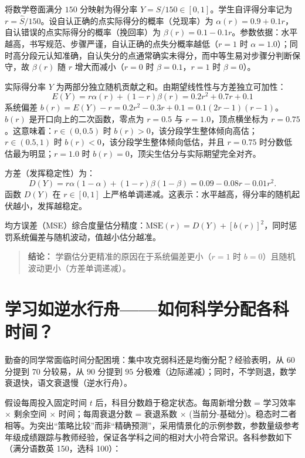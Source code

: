 \documentclass[10pt]{article}
\begin{document}
将数学卷面满分 $150$ 分映射为得分率 $Y=S/150\in[0,1]$。学生自评得分率记为 $r=\widehat S/150$。设自认正确的点实际得分的概率（兑现率）为 $\alpha(r)=0.9+0.1r$，自认错误的点实际得分的概率（挽回率）为 $\beta(r)=0.1-0.1r$。参数依据：水平越高，书写规范、步骤严谨，自认正确的点失分概率越低（$r=1$ 时 $\alpha=1.0$）；同时高分段元认知准确，自认失分的点通常确实未得分，而中等生易对步骤分判断保守，故 $\beta(r)$ 随 $r$ 增大而减小（$r=0$ 时 $\beta=0.1$，$r=1$ 时 $\beta=0$）。

实际得分率 $Y$ 为两部分独立随机贡献之和。由期望线性性与方差独立可加性：
$$
E(Y) = r\alpha(r) + (1-r)\beta(r) = 0.2r^2 + 0.7r + 0.1
$$
系统偏差 $b(r)=E(Y)-r = 0.2r^2 - 0.3r + 0.1 = 0.1(2r-1)(r-1)$。$b(r)$ 是开口向上的二次函数，零点为 $r=0.5$ 与 $r=1.0$，顶点横坐标为 $r=0.75$。这意味着：$r\in(0,0.5)$ 时 $b(r)>0$，该分段学生整体倾向高估；$r\in(0.5,1)$ 时 $b(r)<0$，该分段学生整体倾向低估，并且 $r=0.75$ 时分数低估最为明显；$r=1.0$ 时 $b(r)=0$，顶尖生估分与实际期望完全对齐。

方差（发挥稳定性）为：
$$
D(Y)=r\alpha(1-\alpha) + (1-r)\beta(1-\beta)=0.09-0.08r-0.01r^2.
$$
函数 $D(Y)$ 在 $r\in[0,1]$ 上严格单调递减。这表示：水平越高，得分率的随机起伏越小，发挥越稳定。

均方误差（MSE）综合度量估分精度：$\text{MSE}(r)=D(Y)+[b(r)]^2$，同时惩罚系统偏差与随机波动，值越小估分越准。

\begin{quote}
\textbf{结论：} 学霸估分更精准的原因在于系统偏差更小（$r=1$ 时 $b=0$）且随机波动更小（方差单调递减）。
\end{quote}

\section{学习如逆水行舟——如何科学分配各科时间？}

勤奋的同学常面临时间分配困境：集中攻克弱科还是均衡分配？经验表明，从 $60$ 分提到 $70$ 分较易，从 $90$ 分提到 $95$ 分极难（边际递减）；同时，不学则退，数学衰退快，语文衰退慢（逆水行舟）。

假设每周投入固定时间 $t$ 后，科目分数趋于稳定状态。每周新增分数 = 学习效率 $\times$ 剩余空间 $\times$ 时间；每周衰退分数 = 衰退系数 $\times$ (当前分-基础分)。稳态时二者相等。为突出“策略比较”而非“精确预测”，采用情景化的示例参数，参数量级参考年级成绩跟踪与教师经验，保证各学科之间的相对大小符合常识。各科参数如下（满分语数英 150，选科 100）：
\end{document}

